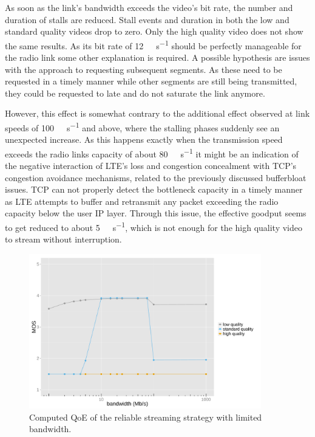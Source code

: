 As soon as the link's bandwidth exceeds the video's bit rate, the number and duration of stalls are reduced. Stall events and duration in both the low and standard quality videos drop to zero. Only the high quality video does not show the same results. As its bit rate of \SI{12}{\mega\bit\per\second} should be perfectly manageable for the radio link some other explanation is required. A possible hypothesis are issues with the approach to requesting subsequent segments. As these need to be requested in a timely manner while other segments are still being transmitted, they could be requested to late and do not saturate the link anymore. 

However, this effect is somewhat contrary to the additional effect observed at link speeds of \SI{100}{\mega\bit\per\second} and above, where the stalling phases suddenly see an unexpected increase. As this happens exactly when the transmission speed exceeds the radio links capacity of about \SI{80}{\mega\bit\per\second} it might be an indication of the negative interaction of \gls{LTE}'s loss and congestion concealment with \gls{TCP}'s congestion avoidance mechanisms, related to the previously discussed bufferbloat issues. \gls{TCP} can not properly detect the bottleneck capacity in a timely manner as \gls{LTE} attempts to buffer and retransmit any packet exceeding the radio capacity below the user \gls{IP} layer. Through this issue, the effective goodput seems to get reduced to about \SI{5}{\mega\bit\per\second}, which is not enough for the high quality video to stream without interruption.

\begin{figure}[htb]
	\centering
	\includegraphics[width=0.9\textwidth]{images/R-ltesim-bwseries-qoe.pdf}
	\caption{Computed \acrshort{QoE} of the reliable streaming strategy with limited bandwidth.}
\label{c6:fig:ltesim-bwseries-qoe}
\end{figure}

